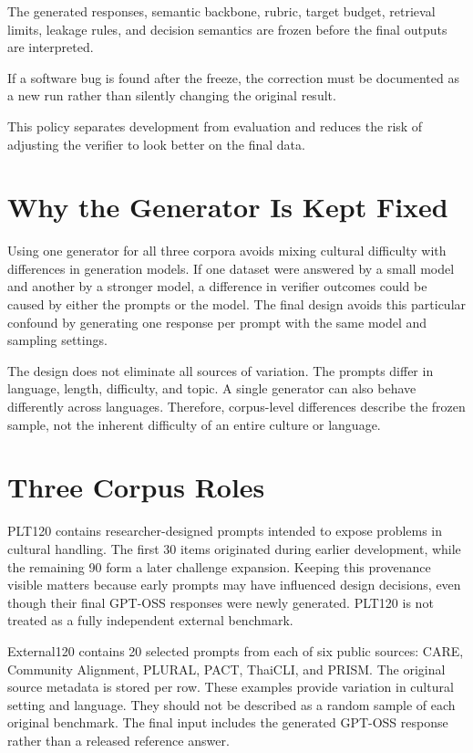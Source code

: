 The generated responses, semantic backbone, rubric, target budget, retrieval limits, leakage rules, and decision semantics are frozen before the final outputs are interpreted.

If a software bug is found after the freeze, the correction must be documented as a new run rather than silently changing the original result.

This policy separates development from evaluation and reduces the risk of adjusting the verifier to look better on the final data.


\section{Why the Generator Is Kept Fixed}

Using one generator for all three corpora avoids mixing cultural difficulty with differences in generation models. If one dataset were answered by a small model and another by a stronger model, a difference in verifier outcomes could be caused by either the prompts or the model. The final design avoids this particular confound by generating one response per prompt with the same model and sampling settings.

The design does not eliminate all sources of variation. The prompts differ in language, length, difficulty, and topic. A single generator can also behave differently across languages. Therefore, corpus-level differences describe the frozen sample, not the inherent difficulty of an entire culture or language.

\section{Three Corpus Roles}

PLT120 contains researcher-designed prompts intended to expose problems in cultural handling. The first 30 items originated during earlier development, while the remaining 90 form a later challenge expansion. Keeping this provenance visible matters because early prompts may have influenced design decisions, even though their final GPT-OSS responses were newly generated. PLT120 is not treated as a fully independent external benchmark.

External120 contains 20 selected prompts from each of six public sources: CARE, Community Alignment, PLURAL, PACT, ThaiCLI, and PRISM. The original source metadata is stored per row. These examples provide variation in cultural setting and language. They should not be described as a random sample of each original benchmark. The final input includes the generated GPT-OSS response rather than a released reference answer.

